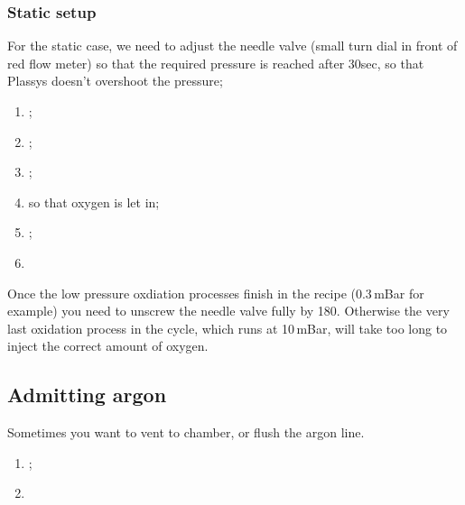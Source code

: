   \subsubsection{Static setup}
  For the static case, we need to adjust the needle valve (small turn
  dial in front  of red flow meter) so that  the required pressure is
  reached  after  30sec,  so   that  Plassys  doesn't  overshoot  the
  pressure;
  \begin{enumerate}
  \item {};
  \item {};
  \item {};
  \item {} so that oxygen is let in;
  \item  {};
  \item  {}
  \end{enumerate}
  {\LARGE Once  the low  pressure oxdiation  processes finish  in the
    recipe (0.3\,mBar  for example)  you need  to unscrew  the needle
    valve  fully  by 180\ideg.   Otherwise  the  very last  oxidation
    process in the cycle, which runs  at 10\,mBar, will take too long
    to inject the correct amount of oxygen.  }

 \subsection{Admitting argon}
 Sometimes you want to vent to chamber, or flush the argon line.
 \begin{enumerate}
 \item {};
 \item {}
 \end{enumerate}


 \newpage
